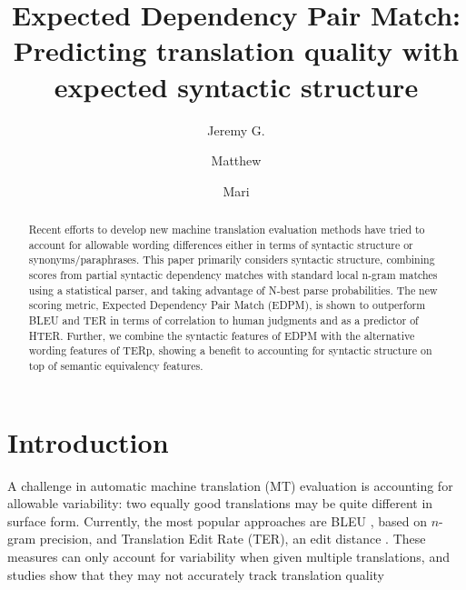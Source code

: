 \documentclass{kluwer}    %
\begin{document}
\begin{article}
\begin{opening}         
\title{Expected Dependency Pair Match:
Predicting translation quality with expected syntactic structure} 
\author{Jeremy G. }  
\author{Matthew }
\author{Mari }  

\begin{abstract}
  Recent efforts to develop new machine translation
  evaluation methods have tried to 
  account for allowable wording differences either in terms of
  syntactic structure or synonyms/paraphrases. This paper primarily considers syntactic structure, combining scores from partial syntactic dependency
  matches with standard local n-gram matches using a statistical
  parser, and taking advantage of N-best parse probabilities.  The new scoring metric, Expected Dependency
  Pair Match (EDPM), is shown to outperform BLEU and TER in terms
  of correlation to human judgments and as a predictor of HTER. Further, we combine the syntactic features of EDPM with the
  alternative wording features of TERp, showing a benefit to accounting for syntactic structure on top of
  semantic equivalency features.
\end{abstract}

\end{opening}           

\section{Introduction}
\label{sec:intro}

A challenge in automatic machine translation (MT) evaluation is accounting
for allowable variability: two equally good
translations may be quite different in surface form. 
Currently, the most popular approaches are BLEU \cite{papineni02bleu},
based on $n$-gram precision, and Translation Edit Rate (TER), an
edit distance \cite{snover06ter}.
These measures can only account for variability when 
given multiple translations, and studies show that they may
not accurately track translation quality 
\cite{charniak03syntaxlmmt,callisonburch06bleuproblems} 


\end{article}
\end{document}
